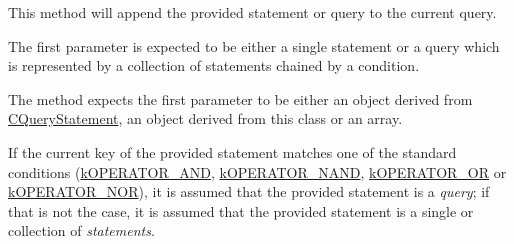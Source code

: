 This method will append the provided statement or query to the current query.

The first parameter is expected to be either a single statement or a query which is represented by a collection of statements chained by a condition.

The method expects the first parameter to be either an object derived from \hyperlink{class_c_query_statement}{C\-Query\-Statement}, an object derived from this class or an array.

If the current key of the provided statement matches one of the standard conditions (\hyperlink{}{k\-O\-P\-E\-R\-A\-T\-O\-R\-\_\-\-A\-N\-D}, \hyperlink{}{k\-O\-P\-E\-R\-A\-T\-O\-R\-\_\-\-N\-A\-N\-D}, \hyperlink{}{k\-O\-P\-E\-R\-A\-T\-O\-R\-\_\-\-O\-R} or \hyperlink{}{k\-O\-P\-E\-R\-A\-T\-O\-R\-\_\-\-N\-O\-R}), it is assumed that the provided statement is a {\itshape query}; if that is not the case, it is assumed that the provided statement is a single or collection of {\itshape statements}.


